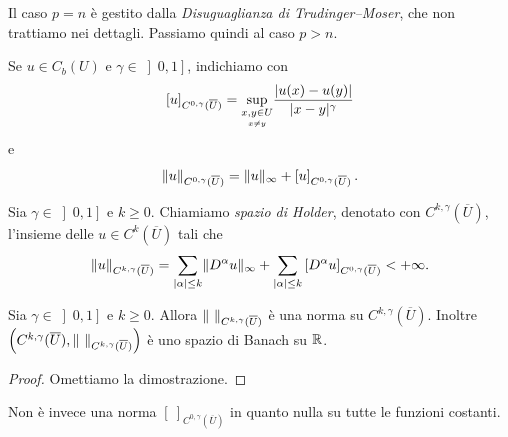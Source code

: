Il caso $p=n$ è gestito dalla \emph{Disuguaglianza di Trudinger--Moser}, che non trattiamo nei dettagli. Passiamo quindi al caso $p > n$.
\begin{notazione}
	Se $u \in C_b(U)$ e $\gamma \in \left] 0,1\right] $, indichiamo con
	\[ \left[ u\right] _{C^{0,\gamma}(\overline{U})} = \underset{\underset{x\ne y}{x, y \in U}}{\textup{sup}}\frac{\lvert u(x)-u(y)\rvert}{\lvert x-y\rvert^\gamma} \]
	e
	\[ \lVert u\rVert_{C^{0,\gamma}(\overline{U})} = \lVert u\rVert_{\infty} + \left[ u\right] _{C^{0,\gamma}(\overline{U})}.\]
\end{notazione}
\begin{definizione}
	Sia $\gamma \in \left] 0,1\right] $ e $k\ge 0$. Chiamiamo \emph{spazio di Holder}, denotato con $C^{k,\gamma}(\overline{U})$, l'insieme delle $u \in C^k(\overline{U})$ tali che 
	\[ \lVert u\rVert_{C^{k,\gamma}(\overline{U})} = \sum_{\lvert\alpha\rvert\le k}\lVert D^\alpha u\rVert_{\infty} + \sum_{\lvert\alpha\rvert\le k} \left[ D^\alpha u\right] _{C^{0,\gamma}(\overline{U})} < +\infty.\]
\end{definizione}
\begin{proposizione}
	Sia $\gamma \in \left] 0,1\right] $ e $k\ge 0$. Allora $\norm{\ }_{C^{k,\gamma}(\overline{U})}$ è una norma su  $C^{k,\gamma}(\overline{U})$. Inoltre $\left(C^{k,\gamma}(\overline{U}),\norm{\ }_{C^{k,\gamma}(\overline{U})}\right)$ è uno spazio di Banach su $\mathbb{R}$.
\end{proposizione}
\begin{proof}
	Omettiamo la dimostrazione.
\end{proof}

Non è invece una norma $ \left[\ \right] _{C^{0,\gamma}(\overline{U})}$ in quanto nulla su tutte le funzioni costanti.

